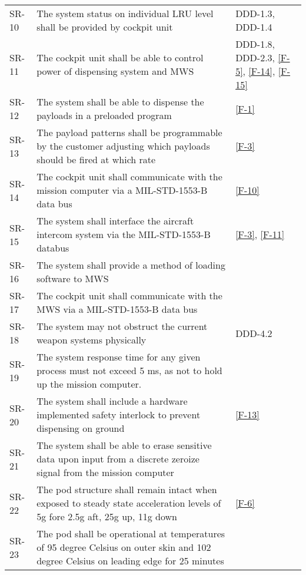 \documentclass[Main]{subfiles}
\begin{document}
\begin{longtable}{p{} p{} p{}}
SR-10 &  The system status on individual LRU level shall be provided by cockpit unit & DDD-1.3, DDD-1.4 \\

SR-11 & The cockpit unit shall be able to control power of dispensing system and MWS & DDD-1.8, DDD-2.3, \ref{F-5}, \ref{F-14}, \ref{F-15} \\

SR-12 & The system shall be able to dispense the payloads in a preloaded program &  \ref{F-1}\\

SR-13 & The payload patterns shall be programmable by the customer adjusting which payloads should be fired at which rate & \ref{F-3} \\

SR-14 & The cockpit unit shall communicate with the mission computer via a MIL-STD-1553-B data bus &  \ref{F-10}\\

SR-15 & The system shall interface the aircraft intercom system via the MIL-STD-1553-B databus & \ref{F-3}, \ref{F-11} \\

SR-16 & The system shall provide a method of loading software to MWS &  \\

SR-17 & The cockpit unit shall communicate with the MWS via a MIL-STD-1553-B data bus &  \\

SR-18 & The system may not obstruct the current weapon systems physically & DDD-4.2 \\

SR-19 & The system response time for any given process must not exceed 5 ms, as not to hold up the mission computer. &  \\

SR-20 & The system shall include a hardware implemented safety interlock to prevent dispensing on ground & \ref{F-13} \\

SR-21 & The system shall be able to erase sensitive data upon input from a discrete zeroize signal from the mission computer &  \\

SR-22 &  The pod structure shall remain intact when exposed to steady state acceleration levels of 5g fore 2.5g aft, 25g up, 11g down & \ref{F-6} \\

SR-23 &  The pod shall be operational at temperatures of 95 degree Celsius on outer skin and 102 degree Celsius on leading edge for 25 minutes &  \\


\end{longtable}
\end{document}
